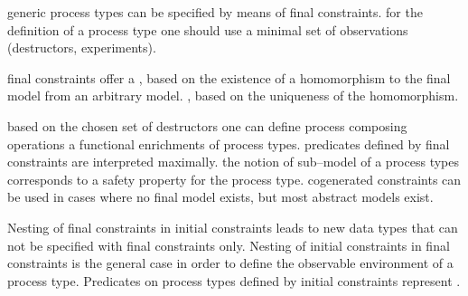 \documentclass[landscape, autoslides, light]{mmiss}
\begin{document}
\begin{Package}[Label={FSDPT}, Title={Formal Specification of Data and Process Types}, ShortTitle={FSDPT}, Authors={Horst Reichel}, Date={February 2003}, LevelOfDetail=Lecture, Language=en-GB]
\begin{Section}[Title={Summary}, Label={section5}]
\begin{Paragraph}[Title={Data Types}, Label=Paragraph150]
\end{Paragraph}
\begin{Paragraph}[Title={Process Types}, Label=Paragraph151]
\begin{List}[ListType=itemize]
    \ListItem generic process types can be specified by means of final
    constraints.\pause
    \ListItem for the definition of a process type one should use a
    minimal set of observations (destructors, experiments). \pause
    \item \begin{List}[ListType=itemize]
        \ListItem final  constraints offer a
       , based on the existence of a
        homomorphism to the final  model from an arbitrary
        model.\pause
        \ListItem {}, based on the uniqueness
        of the homomorphism.
    \end{List}
\end{List}\end{Paragraph}
\begin{Paragraph}[Title={Process Types}, Label=Paragraph152]
\begin{List}[ListType=itemize]
    \ListItem based on the chosen set of destructors one can define
    process composing operations a functional enrichments of
    process types.\pause
    \ListItem predicates defined by final constraints are interpreted
    maximally.\pause
    \ListItem the notion of sub--model of a process types corresponds
    to a safety property for the process type.\pause
    \ListItem cogenerated constraints can be used in cases where no
    final model exists, but most abstract models exist.
\end{List}

\end{Paragraph}
\begin{Paragraph}[Title={Nesting of Process and Data Types}, Label=Paragraph153]

\begin{List}[ListType=itemize]
    \ListItem Nesting of final constraints in initial constraints
    leads to new data types that can not be specified with final
    constraints only.\pause
    \ListItem Nesting of initial constraints in final constraints is
    the general case in order to define the observable environment
    of a process type.\pause
    \ListItem Predicates on process types defined by initial
    constraints represent .

\end{List}\end{Paragraph}
\begin{Paragraph}[Title={Nesting of Process and Data Types}, Label=Paragraph154]
\begin{List}[ListType=itemize]


\end{List}
\end{Paragraph}
\end{Section}
\end{Package}
\end{document}
